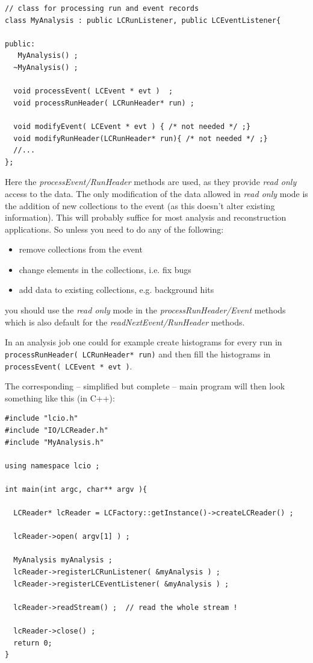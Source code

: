 \documentclass[twoside]{article}
\begin{document}
\begin{verbatim}
// class for processing run and event records
class MyAnalysis : public LCRunListener, public LCEventListener{
 
public:
   MyAnalysis() ;
  ~MyAnalysis() ;
 
  void processEvent( LCEvent * evt )  ;
  void processRunHeader( LCRunHeader* run) ;
 
  void modifyEvent( LCEvent * evt ) { /* not needed */ ;}
  void modifyRunHeader(LCRunHeader* run){ /* not needed */ ;}
  //...
};
\end{verbatim}

Here the {\em processEvent/RunHeader} methods are used, as they provide {\em read only} access to the 
data. The only modification of the data allowed in {\em read only} mode is the addition of new 
collections to the event (as this doesn't alter existing information). This will probably suffice for 
most analysis and reconstruction applications.
So unless you need to do any of the following:
\begin{itemize}
\item remove collections from the event
\item change elements in the collections, i.e. fix bugs
\item add data to existing collections, e.g. background hits
\end{itemize}
you should use the {\em read only} mode in the {\em processRunHeader/Event} methods 
which is also default for the {\em readNextEvent/RunHeader} methods.

In an analysis job one could for example create histograms for every run in \\
\verb$processRunHeader( LCRunHeader* run)$
and then fill the histograms in \verb$processEvent( LCEvent * evt )$.

The corresponding -- simplified but complete -- main program will then look something 
like this (in C++):

\begin{verbatim}
#include "lcio.h"
#include "IO/LCReader.h"
#include "MyAnalysis.h"

using namespace lcio ;

int main(int argc, char** argv ){

  LCReader* lcReader = LCFactory::getInstance()->createLCReader() ;
  
  lcReader->open( argv[1] ) ;

  MyAnalysis myAnalysis ;
  lcReader->registerLCRunListener( &myAnalysis ) ;
  lcReader->registerLCEventListener( &myAnalysis ) ;

  lcReader->readStream() ;  // read the whole stream !

  lcReader->close() ;
  return 0;
}
\end{verbatim}
\end{document}
